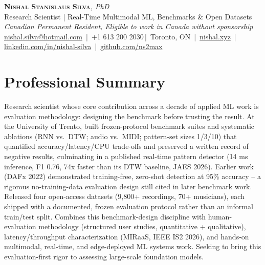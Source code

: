 \documentclass[11pt]{article}
\makeatletter
\newcommand{\cvName}{Nishal Stanislaus Silva}
\newcommand{\cvEmail}{nishal.silva@hotmail.com}
\newcommand{\cvPhone}{+1 613 200 2030}
\newcommand{\cvCity}{Toronto, ON}
\newcommand{\cvSite}{https://nishal.xyz}
\newcommand{\cvLinkedIn}{https://www.linkedin.com/in/nishal-silva}
\newcommand{\cvGitHub}{https://github.com/ns2max}
\newcommand{\cvStatus}{Canadian Permanent Resident, Eligible to work in Canada without sponsorship}
\newcommand{\cvTagline}{Research Scientist | Real-Time Multimodal ML, Benchmarks \& Open Datasets}
\makeatother
\begin{document}
\pagestyle{empty}
\begin{center}
    {\LARGE \scshape \textbf{\cvName}}{\large \textit{, PhD}}\\[1pt]
    {\small \cvTagline}\\[1pt]
    {\footnotesize\textit{\cvStatus}}\\[1pt]
    {\small
    \href{mailto:\cvEmail}{\cvEmail} \,|\, \cvPhone \,|\, \cvCity
    \,|\, \href{\cvSite}{nishal.xyz} \,|\, \href{\cvLinkedIn}{linkedin.com/in/nishal-silva}
    \,|\, \href{\cvGitHub}{github.com/ns2max}}
\end{center}

\section*{Professional Summary}
Research scientist whose core contribution across a decade of applied ML work is evaluation methodology: designing the benchmark before trusting the result. At the University of Trento, built frozen-protocol benchmark suites and systematic ablations (RNN vs.\ DTW; audio vs.\ MIDI; pattern-set sizes 1/3/10) that quantified accuracy/latency/CPU trade-offs and preserved a written record of negative results, culminating in a published real-time pattern detector (14 ms inference, F1 0.76, 74x faster than its DTW baseline, JAES 2026). Earlier work (DAFx 2022) demonstrated training-free, zero-shot detection at 95\% accuracy -- a rigorous no-training-data evaluation design still cited in later benchmark work. Released four open-access datasets (9,800+ recordings, 70+ musicians), each shipped with a documented, frozen evaluation protocol rather than an informal train/test split. Combines this benchmark-design discipline with human-evaluation methodology (structured user studies, quantitative + qualitative), latency/throughput characterization (MIRaaS, IEEE IS2 2026), and hands-on multimodal, real-time, and edge-deployed ML systems work. Seeking to bring this evaluation-first rigor to assessing large-scale foundation models.
\end{document}
